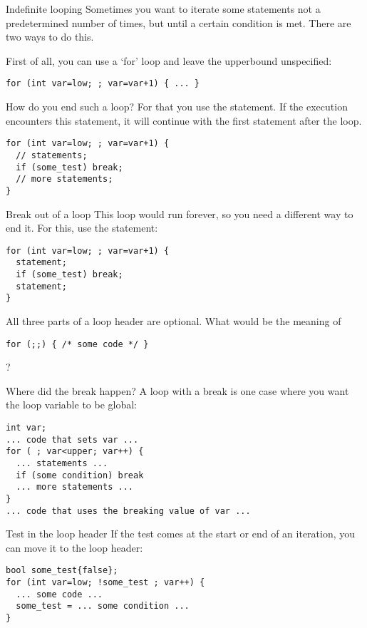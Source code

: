 \begin{slide}{Indefinite looping}
  \label{sl:for-inf}
  Sometimes you want to iterate some statements not a predetermined
  number of times, but until a certain condition is met. There are two
  ways to do this.

  First of all, you can use a `for' loop and leave the upperbound
  unspecified:
\begin{verbatim}
for (int var=low; ; var=var+1) { ... }
\end{verbatim}
\end{slide}

How do you end such a loop? For that you use the
 statement. If the execution encounters this
statement, it will continue with the first statement after the loop.

\begin{verbatim}
for (int var=low; ; var=var+1) {
  // statements;
  if (some_test) break;
  // more statements;
}
\end{verbatim}

\begin{slide}{Break out of a loop}
  \label{sl:for-break}
  This loop would run forever, so you need a different way to end
  it. For this, use the  statement:
\begin{verbatim}
for (int var=low; ; var=var+1) {
  statement;
  if (some_test) break;
  statement;
}
\end{verbatim}
\end{slide}

\begin{exercise}
  All three parts of a loop header are optional. What would be the
  meaning of
\begin{verbatim}
for (;;) { /* some code */ }
\end{verbatim}
?
\end{exercise}

\begin{block}{Where did the break happen?}
  \label{sl:for-break-var}
  A loop with a break is one case where you want the loop variable to
  be global:
\begin{verbatim}
int var;
... code that sets var ...
for ( ; var<upper; var++) {
  ... statements ...
  if (some condition) break
  ... more statements ...
}
... code that uses the breaking value of var ...
\end{verbatim}
\end{block}

\begin{block}{Test in the loop header}
  \label{sl:looptest}
  If the test comes at the start or end of an iteration, you can move it
  to the loop header:
\begin{verbatim}
bool some_test{false};
for (int var=low; !some_test ; var++) {
  ... some code ...
  some_test = ... some condition ...
}
\end{verbatim}
\end{block}

